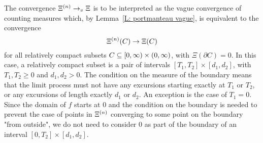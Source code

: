 \begin{note}
	The convergence
	$\Xi^{(n)} \rightarrow_v \Xi$
	is to be interpreted as the vague convergence of counting measures
	which, by Lemma~\ref{L: portmanteau vague},
	is equivalent to the convergence
	\begin{equation*}
	\Xi^{(n)}(C) \rightarrow \Xi(C)
	\end{equation*}
	for all relatively compact subsets
	$C \subseteq [0, \infty) \times (0, \infty)$,
	with $\Xi(\partial C) = 0$.
	In this case, a relatively compact subset is a pair of intervals
	$[T_1, T_2] \times [d_1, d_2]$,
	with $T_1, T_2 \geq 0$
	and $d_1, d_2 > 0$.
	The condition on the measure of the boundary means
	that the limit process must not have any excursions starting exactly at
	$T_1$ or $T_2$,
	or any excursions of length exactly $d_1$ or $d_2$.
	An exception is the case of $T_1=0$.
	Since the domain of $f$ starts at $0$
	and the condition on the boundary is needed to prevent the case of points in $\Xi^{(n)}$ converging to some point on the boundary "from outside",
	we do not need to consider $0$ as part of the boundary of an interval 
	$[0, T_2] \times [d_1, d_2]$.
\end{note}

